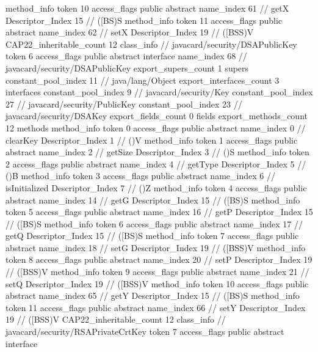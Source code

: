 {{{{{				}
				method_info {
					token	10
					access_flags	public abstract
					name_index	61		// getX
					Descriptor_Index	15		// ([BS)S
				}
				method_info {
					token	11
					access_flags	public abstract
					name_index	62		// setX
					Descriptor_Index	19		// ([BSS)V
				}
			}
			CAP22_inheritable_count	12
		}
		class_info {		// javacard/security/DSAPublicKey
			token	6
			access_flags	public abstract interface
			name_index	68		// javacard/security/DSAPublicKey
			export_supers_count	1
			supers {
				constant_pool_index	11		// java/lang/Object
			}
			export_interfaces_count	3
			interfaces {
				constant_pool_index	9		// javacard/security/Key
				constant_pool_index	27		// javacard/security/PublicKey
				constant_pool_index	23		// javacard/security/DSAKey
			}
			export_fields_count	0
			fields {
			}
			export_methods_count	12
			methods {
				method_info {
					token	0
					access_flags	public abstract
					name_index	0		// clearKey
					Descriptor_Index	1		// ()V
				}
				method_info {
					token	1
					access_flags	public abstract
					name_index	2		// getSize
					Descriptor_Index	3		// ()S
				}
				method_info {
					token	2
					access_flags	public abstract
					name_index	4		// getType
					Descriptor_Index	5		// ()B
				}
				method_info {
					token	3
					access_flags	public abstract
					name_index	6		// isInitialized
					Descriptor_Index	7		// ()Z
				}
				method_info {
					token	4
					access_flags	public abstract
					name_index	14		// getG
					Descriptor_Index	15		// ([BS)S
				}
				method_info {
					token	5
					access_flags	public abstract
					name_index	16		// getP
					Descriptor_Index	15		// ([BS)S
				}
				method_info {
					token	6
					access_flags	public abstract
					name_index	17		// getQ
					Descriptor_Index	15		// ([BS)S
				}
				method_info {
					token	7
					access_flags	public abstract
					name_index	18		// setG
					Descriptor_Index	19		// ([BSS)V
				}
				method_info {
					token	8
					access_flags	public abstract
					name_index	20		// setP
					Descriptor_Index	19		// ([BSS)V
				}
				method_info {
					token	9
					access_flags	public abstract
					name_index	21		// setQ
					Descriptor_Index	19		// ([BSS)V
				}
				method_info {
					token	10
					access_flags	public abstract
					name_index	65		// getY
					Descriptor_Index	15		// ([BS)S
				}
				method_info {
					token	11
					access_flags	public abstract
					name_index	66		// setY
					Descriptor_Index	19		// ([BSS)V
				}
			}
			CAP22_inheritable_count	12
		}
		class_info {		// javacard/security/RSAPrivateCrtKey
			token	7
			access_flags	public abstract interface
}}}
